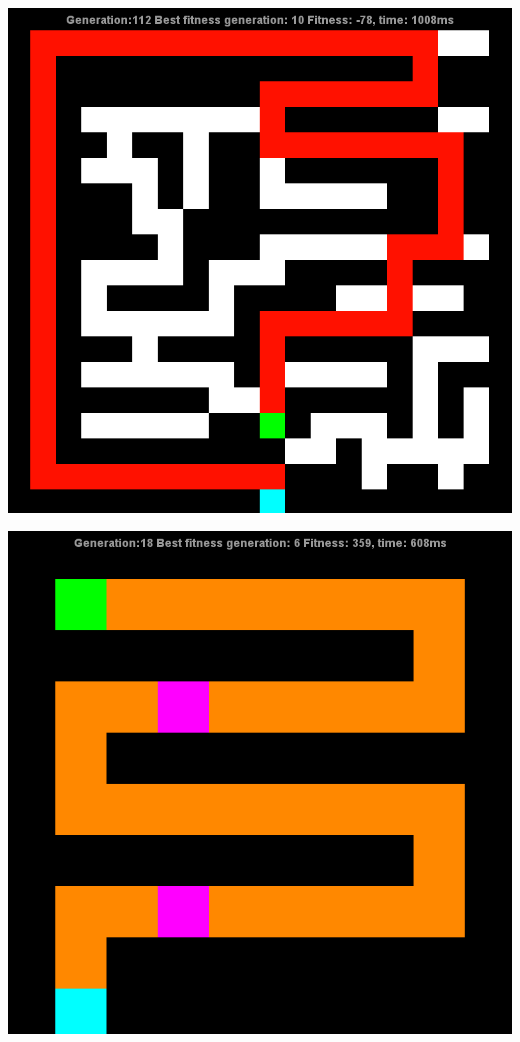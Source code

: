 \documentclass[12pt]{article} %
\begin{document}
\begin{center}
\includegraphics[scale=.6]{maze7}

\includegraphics[scale=.6]{maze8}


\end{center}
\end{document}
